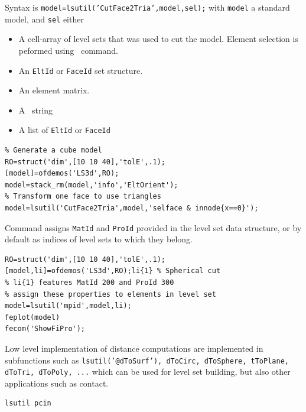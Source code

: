 Syntax is {\tt model=lsutil('CutFace2Tria',model,sel);} with {\tt model} a standard model, and {\tt sel} either
\begin{itemize}
\item A cell-array of level sets that was used to cut the model. Element selection is peformed using~ command.
\item An {\tt EltId} or {\tt FaceId} set structure.
\item An element matrix.
\item A~ string
\item A list of {\tt EltId} or {\tt FaceId}
\end{itemize}

\begin{verbatim}
% Generate a cube model
RO=struct('dim',[10 10 40],'tolE',.1);
[model]=ofdemos('LS3d',RO); 
model=stack_rm(model,'info','EltOrient');
% Transform one face to use triangles
model=lsutil('CutFace2Tria',model,'selface & innode{x==0}');
\end{verbatim}%



Command  assigns {\tt MatId} and {\tt ProId} provided in the level set data structure, or by default as indices of level sets to which they belong.

\begin{verbatim}
RO=struct('dim',[10 10 40],'tolE',.1);
[model,li]=ofdemos('LS3d',RO);li{1} % Spherical cut
% li{1} features MatId 200 and ProId 300
% assign these properties to elements in level set
model=lsutil('mpid',model,li);
feplot(model)
fecom('ShowFiPro');
\end{verbatim}%







Low level implementation of distance computations are implemented in subfunctions such as {\tt lsutil('@dToSurf'), dToCirc, dToSphere, tToPlane, dToTri, dToPoly, ...} which can be used for level set building, but also other applications such as contact.  

\begin{verbatim}
lsutil pcin
\end{verbatim}



\noindent \feplot 
